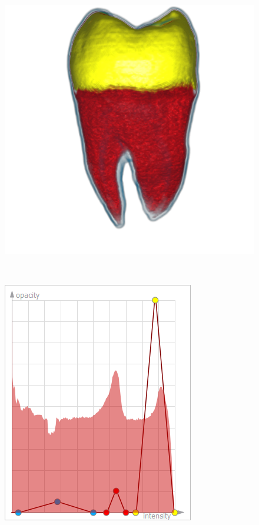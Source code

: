 \begin{figure}
\begin{minipage}{.2\textwidth}
		\subcaption{}
	\end{minipage}~
	\begin{minipage}{.29\textwidth}
		\includegraphics[width=1\linewidth]{images/tooth_naive_optimized_linesearch}
		\subcaption{}
	\end{minipage}~
	\begin{minipage}{.2\textwidth}
		\includegraphics[width=1\linewidth]{figures/tf_tooth_naive_optimized_linesearch}
		\subcaption{}
	\end{minipage}
	

\end{figure}
